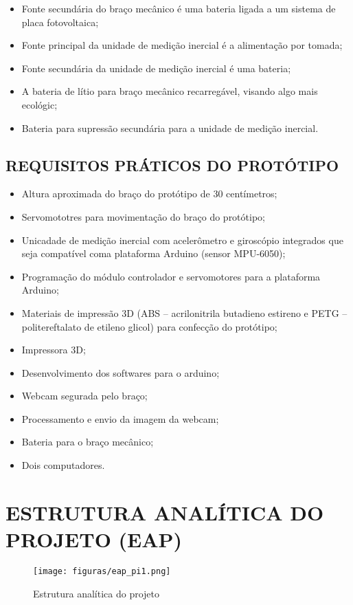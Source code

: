 \begin{itemize}
\item Fonte secundária do braço mecânico é uma bateria ligada a um sistema de placa fotovoltaica;
\item Fonte principal da unidade de medição inercial é a alimentação por tomada;
\item Fonte secundária da unidade de medição inercial é uma bateria;
\item A bateria de lítio para braço mecânico recarregável, visando algo mais ecológic; 
\item Bateria para supressão secundária para a unidade de medição inercial.
\end{itemize}

\subsection{REQUISITOS PRÁTICOS DO PROTÓTIPO}

\begin{itemize}
\item Altura aproximada do braço do protótipo de 30 centímetros;
\item Servomototres para movimentação do braço do protótipo;
\item Unicadade de medição inercial com acelerômetro e giroscópio integrados que seja compatível coma plataforma Arduino (sensor MPU-6050);
\item Programação do módulo controlador e servomotores para a plataforma Arduino;
\item Materiais de impressão 3D (ABS – acrilonitrila butadieno estireno e PETG – politereftalato de etileno glicol) para confecção do protótipo;
\item Impressora 3D;
\item Desenvolvimento dos softwares para o arduino;
\item Webcam segurada pelo braço;
\item Processamento e envio da imagem da webcam;
\item Bateria para o braço mecânico;
\item Dois computadores.
\end{itemize}

\section{ESTRUTURA ANALÍTICA DO PROJETO (EAP)}

\begin{figure}[H]
	\centering
	\texttt{[image: figuras/eap\_pi1.png]}
	\caption{Estrutura analítica do projeto}
	\label{eap_fig01}
\end{figure}

